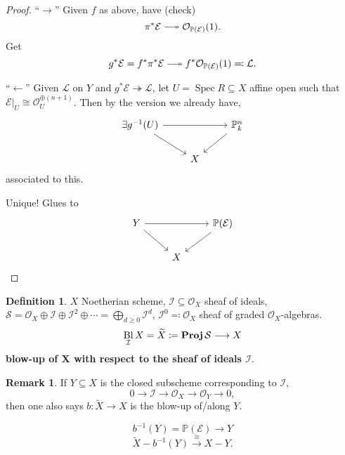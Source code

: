 \documentclass[12pt]{article}
\DeclareMathOperator{\Spec}{Spec}
\DeclareMathOperator{\relProj}{\textnormal{\textbf{Proj}}}
\DeclareMathOperator{\Bl}{Bl}
\theoremstyle{definition}
\newtheorem*{definition}{Definition}
\newtheorem*{remark}{Remark}
\begin{document}
\begin{proof}
``$\rightarrow$'' Given $f$ as above, have (check)
\[\pi^*\mathcal E\relbar\joinrel\twoheadrightarrow\mathcal O_{\mathbb P(\mathcal E)}(1).\]
Get
\[g^*\mathcal E=f^*\pi^*\mathcal E\relbar\joinrel\twoheadrightarrow f^*\mathcal O_{\mathbb P(\mathcal E)}(1)\eqqcolon\mathcal L.\]

``$\leftarrow$'' Given $\mathcal L$ on $Y$ and $g^*\mathcal E\twoheadrightarrow\mathcal L$, let $U=\Spec R\subseteq X$ affine open such that $\mathcal E|_U\cong\mathcal O_U^{\oplus(n+1)}$. Then by the version we already have,
\[\begin{tikzcd}\exists g^{-1}(U)\arrow[rr]\arrow[rd]&&\mathbb P_k^n\arrow[ld]\\&X\end{tikzcd}\]
associated to this.

Unique! Glues to
\[\begin{tikzcd}Y\arrow[rr]\arrow[rd]&&\mathbb P(\mathcal E)\arrow[ld]\\&X\end{tikzcd}\]
\end{proof}

\begin{definition}
$X$ Noetherian scheme, $\mathcal I\subseteq\mathcal O_X$ sheaf of ideals, $\mathcal S=\mathcal O_X\oplus\mathcal I\oplus\mathcal I^2\oplus\cdots=\bigoplus_{d\geq0}\mathcal I^d$, $\mathcal I^0\eqqcolon\mathcal O_X$ sheaf of graded $\mathcal O_X$-algebras.
\[\Bl_\mathcal IX=\widetilde X\coloneqq\relProj\mathcal S\longrightarrow X\]
\textbf{blow-up of $\boldsymbol X$ with respect to the sheaf of ideals $\boldsymbol{\mathcal I}$}.
\end{definition}

\begin{remark}
If $Y\subseteq X$ is the closed subscheme corresponding to $\mathcal I$,
\[0\longrightarrow\mathcal I\longrightarrow\mathcal O_X\longrightarrow\mathcal O_Y\longrightarrow0,\]
then one also says $b:\widetilde X\rightarrow X$ is the blow-up of/along $Y$.

\[b^{-1}(Y)=\mathbb P(\mathcal E)\longrightarrow Y\]
\[\widetilde X-b^{-1}(Y)\overset\cong\longrightarrow X-Y.\]
\end{remark}
\end{document}
